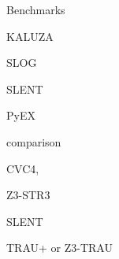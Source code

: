 
Benchmarks


KALUZA

SLOG

SLENT

PyEX \cite{ReynoldsWBBLT17}

comparison

CVC4,

Z3-STR3

SLENT

TRAU+ or Z3-TRAU
